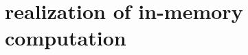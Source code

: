 \documentclass[conference]{IEEEtran}
\begin{document}





\medskip

\section{realization of in-memory computation}
\end{document}
